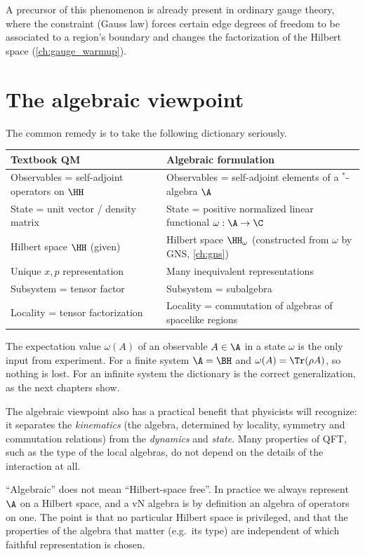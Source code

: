 A precursor of this phenomenon is already present in ordinary gauge theory, where the constraint (Gauss law) forces certain edge degrees of freedom to be associated to a region's boundary and changes the factorization of the Hilbert space (\cref{ch:gauge_warmup}).

\section{The algebraic viewpoint}

The common remedy is to take the following dictionary seriously.

\begin{center}
\renewcommand{\arraystretch}{1.3}
\begin{tabular}{@{}ll@{}}
\toprule
Textbook QM & Algebraic formulation\\
\midrule
Observables = self-adjoint operators on $\HH$ & Observables = self-adjoint elements of a $^*$-algebra $\A$\\
State = unit vector / density matrix & State = positive normalized linear functional $\omega:\A\to\C$\\
Hilbert space $\HH$ (given) & Hilbert space $\HH_\omega$ (constructed from $\omega$ by GNS, \cref{ch:gns})\\
Unique $x,p$ representation & Many inequivalent representations\\
Subsystem = tensor factor & Subsystem = subalgebra\\
Locality = tensor factorization & Locality = commutation of algebras of spacelike regions\\
\bottomrule
\end{tabular}
\end{center}

The expectation value $\omega(A)$ of an observable $A\in\A$ in a state $\omega$ is the only input from experiment. For a finite system $\A=\BH$ and $\omega(A)=\Tr(\rho A)$, so nothing is lost. For an infinite system the dictionary is the correct generalization, as the next chapters show.

The algebraic viewpoint also has a practical benefit that physicists will recognize: it separates the \emph{kinematics} (the algebra, determined by locality, symmetry and commutation relations) from the \emph{dynamics} and \emph{state}. Many properties of QFT, such as the type of the local algebras, do not depend on the details of the interaction at all.

\begin{whatwrong}
``Algebraic'' does not mean ``Hilbert-space free''. In practice we always represent $\A$ on a Hilbert space, and a vN algebra is by definition an algebra of operators on one. The point is that no particular Hilbert space is privileged, and that the properties of the algebra that matter (e.g.\ its type) are independent of which faithful representation is chosen.
\end{whatwrong}


